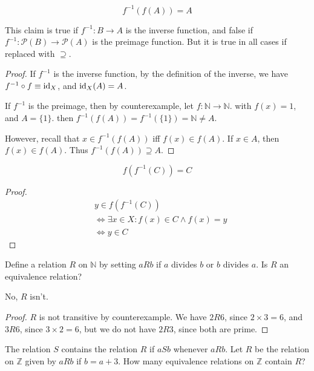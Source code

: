 \documentclass[12pt]{article}
\begin{document}
\begin{claim*}[v]
    \[
    f^{-1}(f(A)) = A
    \]
\end{claim*}

This claim is true if $f^{-1} : B \to A$ is the inverse function,
and false if $f^{-1} : \mathcal{P}(B) \to \mathcal{P}(A)$ is the preimage function.
But it is true in all cases if replaced with $\supseteq$.

\begin{proof}
    If $f^{-1}$ is the inverse function, by the definition of the inverse,
    we have $f^{-1} \circ f \equiv \operatorname{id}_{X}$, and $\operatorname{id}_{X}(A) = A$.

    If $f^{-1}$ is the preimage, then by counterexample,
    let $f : \mathbb{N} \to \mathbb{N}$. with $f(x) = 1$, and $A = \{1\}$.
    then $f^{-1}(f(A)) = f^{-1}(\{1\}) = \mathbb{N} \ne A$.

    However, recall that $x \in f^{-1}(f(A))$ iff
    $f(x) \in f(A)$. If $x \in A$, then
    $f(x) \in f(A)$. Thus $f^{-1}(f(A)) \supseteq A$.
\end{proof}

\begin{claim*}[vi]
    \[
    f(f^{-1}(C)) = C
    \]
\end{claim*}
\begin{proof}
    \begin{align*}
        &y \in f(f^{-1}(C))\\
        &\iff \exists x \in X : f(x) \in C \land f(x) = y\\
        &\iff y \in C
    \end{align*}
\end{proof}

\begin{question}
    Define a relation $R$ on $\mathbb{N}$ by
    setting $aRb$ if $a$ divides $b$ or $b$ divides $a$.
    Is $R$ an equivalence relation?
\end{question}

No, $R$ isn't.
\begin{proof}
    $R$ is not transitive by counterexample. 
    We have $2 R 6$, since $2 \times 3 = 6$,
    and $3 R 6$, since $3 \times 2 = 6$,
    but we do not have $2 R 3$, since both are prime.
\end{proof}

\begin{question}
    The relation $S$ contains the relation $R$
    if $aSb$ whenever $aRb$.
    Let $R$ be the relation on $\mathbb{Z}$
    given by $aRb$ if $b = a+3$.
    How many equivalence relations on $\mathbb{Z}$ contain $R$?
\end{question}
\end{document}
